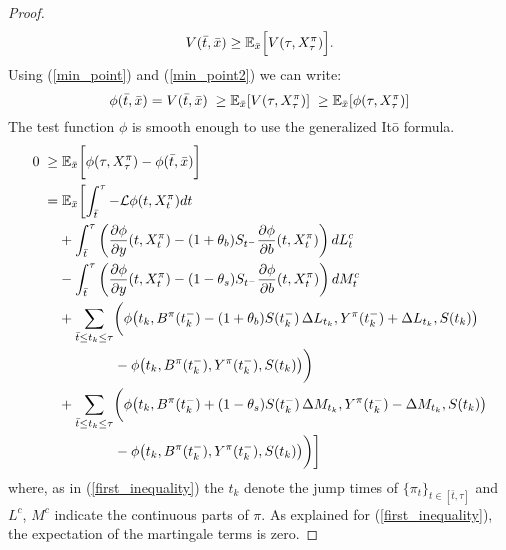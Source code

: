 \begin{proof}
\begin{equation}
  V(\bar t, \bar x) \geq \mathbb{E}_{\bar x} \Bigl[ V(\tau, X^{\pi}_{\tau}) \Bigr].
\end{equation}
Using (\ref{min_point}) and (\ref{min_point2}) we can write:
\begin{equation*}
 \phi(\bar t, \bar x) = V(\bar t, \bar x) \; \geq \mathbb{E}_{\bar x}[V(\tau, X^{\pi}_{\tau})] \; 
 \geq \mathbb{E}_{\bar x}[\phi(\tau, X^{\pi}_{\tau})]
\end{equation*}
The test function $\phi$ is smooth enough to use the generalized It\=o formula.
\begin{align}\label{first_inequality2}
 0 \; \geq & \; \mathbb{E}_{\bar x} \biggl[ \phi(\tau, X^{\pi}_{\tau}) - \phi(\bar t, \bar x) \biggr] \\ \nonumber
    = & \; \mathbb{E}_{\bar x} \biggl[ \int_{\bar t}^{\tau} -\mathcal{L} \phi(t,X^{\pi}_t) dt \\ \nonumber
    & + \int_{\bar t}^{\tau} \left(\frac{\partial \phi}{\partial y}(t, X^{\pi}_t) -(1+\theta_b) S_{t^-} \frac{\partial \phi}{\partial b}( t, X^{\pi}_t)\right) dL^c_t \\ \nonumber
    & - \int_{\bar t}^{\tau} \left(\frac{\partial \phi}{\partial y}( t, X^{\pi}_t)-(1-\theta_s) S_{t^-} \frac{\partial \phi}{\partial b}( t, X^{\pi}_t)\right) dM^c_t \\ \nonumber
    & + \sum_{\bar t \leq t_k \leq \tau} \biggl( \phi \bigl( t_k, B^{\pi}(t_k^-) - (1+\theta_b) S(t_k^-)\, \Delta L_{t_k}, Y^{\pi}(t_k^-) + \Delta L_{t_k}, S(t_k) \bigr) \\ \nonumber 
    & \hspace{4em} - \phi \bigl(t_k, B^{\pi}(t_k^-), Y^{\pi}(t_k^-), S(t_k) \bigr) \biggr) \\ \nonumber
    & + \sum_{\bar t \leq t_k \leq \tau} \biggl( \phi \bigl( t_k, B^{\pi}(t_k^-) + (1-\theta_s) S(t_k^-)\, \Delta M_{t_k}, Y^{\pi}(t_k^-) - \Delta M_{t_k}, S(t_k) \bigr) \\
    & \hspace{4em} - \phi \bigl(t_k, B^{\pi}(t_k^-), Y^{\pi}(t_k^-), S(t_k) \bigr) \biggr) \biggr] 
\end{align}
where, as in (\ref{first_inequality}) the $t_k$ denote the jump times of $\{\pi_t\}_{t \in [\bar t, \tau]}$ and $L^c$, $M^c$ indicate the continuous parts of $\pi$. 
As explained for (\ref{first_inequality}), the expectation of the martingale terms is zero.


\end{proof}
